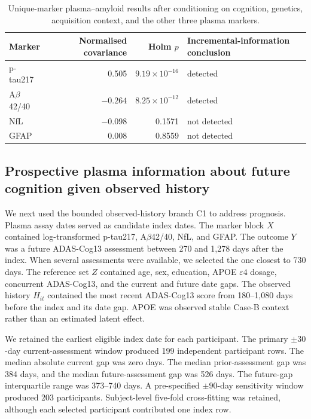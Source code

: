 \documentclass[11pt]{article}
\theoremstyle{definition}
\begin{document}
\begin{table}[!ht]
\centering
\caption{Unique-marker plasma--amyloid results after conditioning on cognition,
genetics, acquisition context, and the other three plasma markers.}
\label{tab:adni-plasma-amyloid}
\begin{tabular}{lrrl}
\toprule
Marker & Normalised covariance & Holm $p$ & Incremental-information conclusion \\
\midrule
p-tau217 & 0.505 & $9.19\times10^{-16}$ & detected \\
A$\beta$42/40 & $-0.264$ & $8.25\times10^{-12}$ & detected \\
NfL & $-0.098$ & 0.1571 & not detected \\
GFAP & 0.008 & 0.8559 & not detected \\
\bottomrule
\end{tabular}
\end{table}

\subsection{Prospective plasma information about future cognition given observed history}

We next used the bounded observed-history branch C1 to address prognosis. Plasma assay dates
served as candidate index dates. The marker block $X$ contained log-transformed p-tau217,
A$\beta$42/40, NfL, and GFAP. The outcome $Y$ was a future ADAS-Cog13 assessment between 270
and 1,278 days after the index. When several assessments were available, we selected the one
closest to 730 days. The reference set $Z$ contained age, sex, education, APOE $\varepsilon4$
dosage, concurrent ADAS-Cog13, and the current and future date gaps. The observed history
$H_{it}$ contained the most recent ADAS-Cog13 score from 180--1,080 days before the index and
its date gap. APOE was observed stable Case-B context rather than an estimated latent effect.

We retained the earliest eligible index date for each participant. The primary $\pm30$-day
current-assessment window produced 199 independent participant rows. The median absolute
current gap was zero days. The median prior-assessment gap was 384 days, and the median
future-assessment gap was 526 days. The future-gap interquartile range was 373--740 days. A
pre-specified $\pm90$-day sensitivity window produced 203 participants. Subject-level
five-fold cross-fitting was retained, although each selected participant contributed one
index row.
\end{document}
